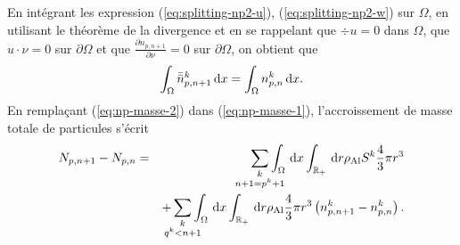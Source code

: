 En intégrant les expression (\ref{eq:splitting-np2-u}),
(\ref{eq:splitting-np2-w}) sur $\Omega$, en utilisant le théorème
de la divergence et en se rappelant que $\div u = 0$ dans $\Omega$,
que $u\cdot\nu = 0$ sur $\partial \Omega$ et que $\frac{\partial
  n_{p,n+1}}{\partial \nu} = 0$ sur $\partial \Omega$, on obtient que
\begin{equation}\label{eq:np-masse-2}
  \int_\Omega \bar{\bar n}_{p,n+1}^k\,\mathrm dx = \int_\Omega n_{p,n}^k\,\mathrm dx.
\end{equation}
En remplaçant (\ref{eq:np-masse-2}) dans (\ref{eq:np-masse-1}),
l'accroissement de masse totale de particules s'écrit
\begin{eqnarray}\label{eq:np-masse-3}
  N_{p,n+1} - N_{p,n} &=&\sum_{\mathclap{\substack{k\\ n+1 = p^k+1}}} \displaystyle\int_\Omega\intd{x}\displaystyle\int_\rplus\intd{r} \aluminadensity S^k\frac{4}{3}\pi
  r^3 \nonumber\\
  && + \sum_{\mathclap{\substack{k \\ q^k < n+1}}} \displaystyle\int_\Omega\intd{x}\displaystyle\int_\rplus\intd{r} \aluminadensity \frac{4}{3}\pi
    r^3\parent{n_{p,n+1}^k - n_{p,n}^k}.
\end{eqnarray}

